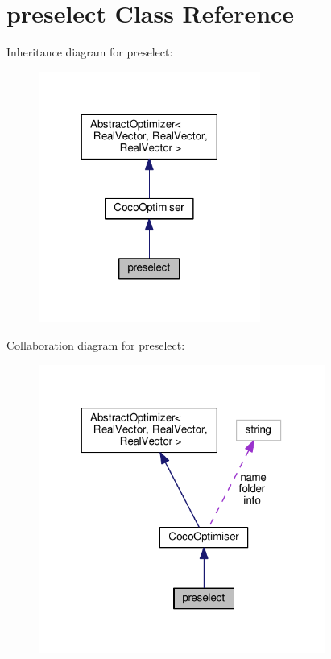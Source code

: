 \hypertarget{classpreselect}{}\section{preselect Class Reference}
\label{classpreselect}


Inheritance diagram for preselect\+:\nopagebreak
\begin{figure}[H]
\begin{center}
\leavevmode
\includegraphics[width=206pt]{classpreselect__inherit__graph}
\end{center}
\end{figure}


Collaboration diagram for preselect\+:\nopagebreak
\begin{figure}[H]
\begin{center}
\leavevmode
\includegraphics[width=266pt]{classpreselect__coll__graph}
\end{center}
\end{figure}
